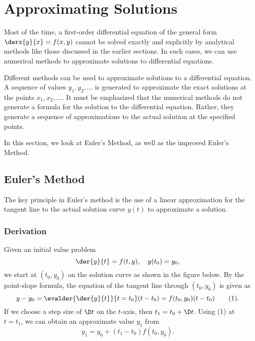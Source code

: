 \section{Approximating Solutions}

Most of the time, a first-order differential equation of the general form $\derx{y}{x} = f(x, y)$ cannot be solved exactly and explicitly by analytical methods like those discussed in the earlier sections. In such cases, we can use numerical methods to approximate solutions to differential equations.

Different methods can be used to approximate solutions to a differential equation. A sequence of values $y_1, y_2, \dots$ is generated to approximate the exact solutions at the points $x_1, x_2, \dots$. It must be emphasized that the numerical methods do not generate a formula for the solution to the differential equation. Rather, they generate a sequence of approximations to the actual solution at the specified points.

In this section, we look at Euler's Method, as well as the improved Euler's Method.

\subsection{Euler's Method}

The key principle in Euler's method is the use of a linear approximation for the tangent line to the actual solution curve $y(t)$ to approximate a solution.

\subsubsection{Derivation}

Given an initial value problem \[\der{y}{t} = f(t, y), \quad y(t_0) = y_0,\] we start at $(t_0, y_0)$ on the solution curve as shown in the figure below. By the point-slope formula, the equation of the tangent line through $(t_0, y_0)$ is given as \[y - y_0 = \evalder{\der{y}{t}}{t=t_0} (t - t_0) = f(t_0, y_0) (t - t_0) \tag{1}.\] If we choose a step size of $\D t$ on the $t$-axis, then $t_1 = t_0 + \D t$. Using (1) at $t = t_1$, we can obtain an approximate value $y_1$ from \[y_1 = y_0 + (t_1 - t_0) f(t_0, y_0) \tag{2}.\] 


